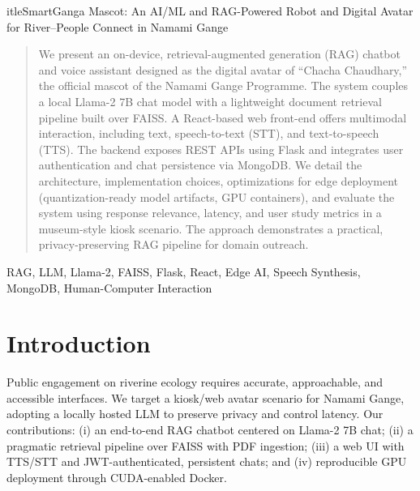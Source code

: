 \documentclass[conference]{IEEEtran}
\begin{document}
	itle{SmartGanga Mascot: An AI/ML and RAG-Powered Robot and Digital Avatar for River--People Connect in Namami Gange}

\author{
}

\maketitle

\begin{abstract}
We present an on-device, retrieval-augmented generation (RAG) chatbot and voice assistant designed as the digital avatar of ``Chacha Chaudhary,'' the official mascot of the Namami Gange Programme. The system couples a local Llama-2 7B chat model with a lightweight document retrieval pipeline built over FAISS. A React-based web front-end offers multimodal interaction, including text, speech-to-text (STT), and text-to-speech (TTS). The backend exposes REST APIs using Flask and integrates user authentication and chat persistence via MongoDB. We detail the architecture, implementation choices, optimizations for edge deployment (quantization-ready model artifacts, GPU containers), and evaluate the system using response relevance, latency, and user study metrics in a museum-style kiosk scenario. The approach demonstrates a practical, privacy-preserving RAG pipeline for domain outreach.
\end{abstract}

\begin{IEEEkeywords}
RAG, LLM, Llama-2, FAISS, Flask, React, Edge AI, Speech Synthesis, MongoDB, Human-Computer Interaction
\end{IEEEkeywords}

\section{Introduction}
Public engagement on riverine ecology requires accurate, approachable, and accessible interfaces. We target a kiosk/web avatar scenario for Namami Gange, adopting a locally hosted LLM to preserve privacy and control latency. Our contributions: (i) an end-to-end RAG chatbot centered on Llama-2 7B chat; (ii) a pragmatic retrieval pipeline over FAISS with PDF ingestion; (iii) a web UI with TTS/STT and JWT-authenticated, persistent chats; and (iv) reproducible GPU deployment through CUDA-enabled Docker.
\end{document}

